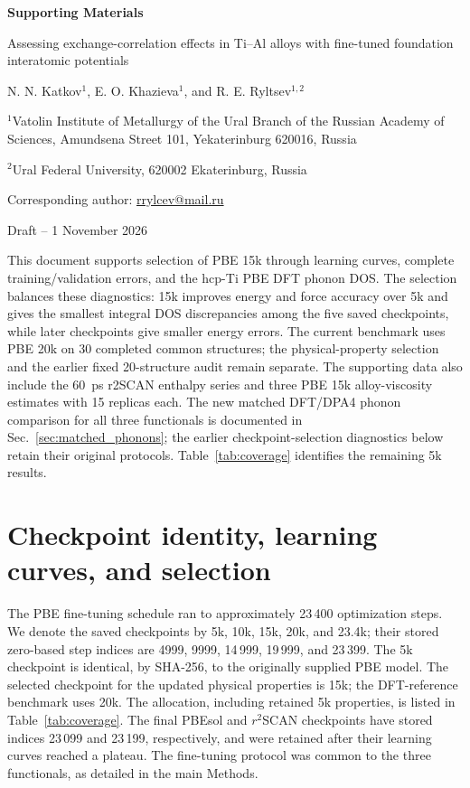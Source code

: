 \documentclass[10pt]{article}
\newcommand{\rscan}{\ensuremath{r^{2}}SCAN}
\begin{document}
\begin{center}
{\Large\bfseries Supporting Materials}\par\medskip
{\large Assessing exchange-correlation effects in Ti--Al alloys with fine-tuned foundation interatomic potentials}\par\medskip
N. N. Katkov$^{1}$, E. O. Khazieva$^{1}$, and R. E. Ryltsev$^{1,2}$\par
{\small $^{1}$Vatolin Institute of Metallurgy of the Ural Branch of the Russian Academy of Sciences, Amundsena Street 101, Yekaterinburg 620016, Russia\par
$^{2}$Ural Federal University, 620002 Ekaterinburg, Russia\par
Corresponding author: \href{mailto:rrylcev@mail.ru}{rrylcev@mail.ru}}\par\medskip
Draft -- 1 November 2026
\end{center}

This document supports selection of PBE 15k through learning curves, complete training/validation errors, and the hcp-Ti PBE DFT phonon DOS. The selection balances these diagnostics: 15k improves energy and force accuracy over 5k and gives the smallest integral DOS discrepancies among the five saved checkpoints, while later checkpoints give smaller energy errors. The current benchmark uses PBE 20k on 30 completed common structures; the physical-property selection and the earlier fixed 20-structure audit remain separate. The supporting data also include the 60~ps r2SCAN enthalpy series and three PBE 15k alloy-viscosity estimates with 15 replicas each. The new matched DFT/DPA4 phonon comparison for all three functionals is documented in Sec.~\ref{sec:matched_phonons}; the earlier checkpoint-selection diagnostics below retain their original protocols. Table~\ref{tab:coverage} identifies the remaining 5k results.

\section{Checkpoint identity, learning curves, and selection}
\label{sec:selection}
The PBE fine-tuning schedule ran to approximately 23\,400 optimization steps. We denote the saved checkpoints by 5k, 10k, 15k, 20k, and 23.4k; their stored zero-based step indices are 4999, 9999, 14\,999, 19\,999, and 23\,399. The 5k checkpoint is identical, by SHA-256, to the originally supplied PBE model. The selected checkpoint for the updated physical properties is 15k; the DFT-reference benchmark uses 20k. The allocation, including retained 5k properties, is listed in Table~\ref{tab:coverage}. The final PBEsol and \rscan{} checkpoints have stored indices 23\,099 and 23\,199, respectively, and were retained after their learning curves reached a plateau. The fine-tuning protocol was common to the three functionals, as detailed in the main Methods.
\end{document}
